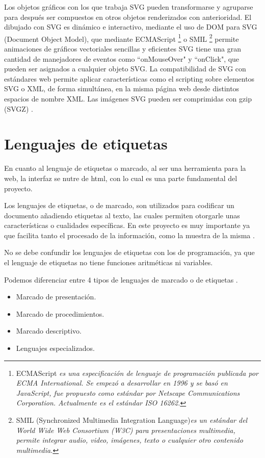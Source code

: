 Los objetos gráficos con los que trabaja SVG pueden transformarse y agruparse para después ser compuestos en otros objetos renderizados con anterioridad. 
El dibujado con SVG es dinámico e interactivo, mediante el uso de DOM para SVG (Document Object Model), que mediante ECMAScript \footnote{ECMAScript \textit{es una especificación de lenguaje de programación publicada por ECMA International. Se empezó a desarrollar en 1996 y se basó en JavaScript, fue propuesto como estándar por Netscape Communications Corporation. Actualmente es el estándar ISO 16262.}} o SMIL \footnote{SMIL (Synchronized Multimedia Integration Language)\textit{es un estándar del World Wide Web Consortium (W3C) para presentaciones multimedia, permite integrar audio, video, imágenes, texto o cualquier otro contenido multimedia.}} permite animaciones de gráficos vectoriales sencillas y eficientes
SVG tiene una gran cantidad de manejadores de eventos como ``onMouseOver" y ``onClick", que pueden ser asignados a cualquier objeto SVG. La compatibilidad de SVG con estándares web permite aplicar características como el scripting sobre elementos SVG o XML, de forma simultánea, en la misma página web desde distintos espacios de nombre XML.
Las imágenes SVG pueden ser comprimidas con gzip (SVGZ) \cite{scalablevec}.


\section{Lenguajes de etiquetas}\label{lenguajes-etiuetas}

En cuanto al lenguaje de etiquetas o marcado, al ser una herramienta para la web, la interfaz se nutre de html, con lo cual es una parte fundamental del proyecto.

Los lenguajes de etiquetas, o de marcado, son utilizados para codificar un documento añadiendo etiquetas al texto, las cuales permiten otorgarle unas características o cualidades específicas. En este proyecto es muy importante ya que facilita tanto el procesado de la información, como la muestra de la misma \cite{lenguajemarc}.

No se debe confundir los lenguajes de etiquetas con los de programación, ya que el lenguaje de etiquetas no tiene funciones aritméticas ni variables.

Podemos diferenciar entre 4 tipos de lenguajes de marcado o de etiquetas \cite{lenguajemarcecu} \cite{lmarcas}.
\begin{itemize}
\item
Marcado de presentación.
\item
Marcado de procedimientos.
\item
Marcado descriptivo.
\item
Lenguajes especializados.

\end{itemize}

